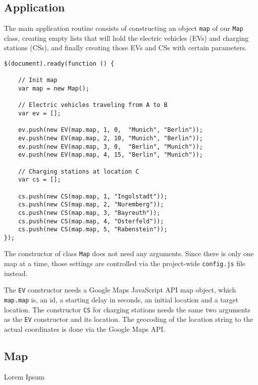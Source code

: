 \newpage
\subsection{Application}

The main application routine consists of constructing an object \texttt{map} of our \texttt{Map} class, creating empty lists that will hold the electric vehicles (EVs) and charging stations (CSs), and finally creating those EVs and CSs with certain parameters.

\begin{verbatim}
$(document).ready(function () {

    // Init map
    var map = new Map();

    // Electric vehicles traveling from A to B
    var ev = [];

    ev.push(new EV(map.map, 1, 0,  "Munich", "Berlin"));
    ev.push(new EV(map.map, 2, 10, "Munich", "Berlin"));
    ev.push(new EV(map.map, 3, 0,  "Berlin", "Munich"));
    ev.push(new EV(map.map, 4, 15, "Berlin", "Munich"));

    // Charging stations at location C
    var cs = [];

    cs.push(new CS(map.map, 1, "Ingolstadt"));
    cs.push(new CS(map.map, 2, "Nuremberg"));
    cs.push(new CS(map.map, 3, "Bayreuth"));
    cs.push(new CS(map.map, 4, "Osterfeld"));
    cs.push(new CS(map.map, 5, "Rabenstein"));
});
\end{verbatim}

The constructor of class \texttt{Map} does not need any arguments. Since there is only one map at a time, those settings are controlled via the project-wide \texttt{config.js} file instead.

The \texttt{EV} constructor needs a Google Maps JavaScript API map object, which \texttt{map.map} is, an id, a starting delay in seconds, an initial location and a target location. The constructor \texttt{CS} for charging stations needs the same two arguments as the \texttt{EV} constructor and its location. The geocoding of the location string to the actual coordinates is done via the Google Maps API.


\newpage
\subsection{Map}

Lorem Ipsum

